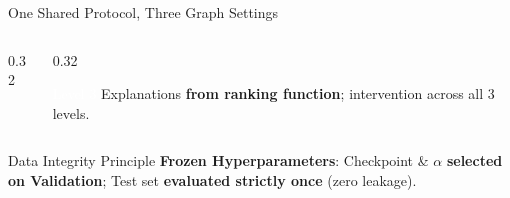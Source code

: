 \documentclass[aspectratio=169,10pt]{beamer}
\begin{document}
\begin{frame}{One Shared Protocol, Three Graph Settings}
\begin{columns}[t]
\begin{column}{0.32\textwidth}
    \end{column}
    \begin{column}{0.32\textwidth}
      \begin{block}{\textcolor{white}{Level 3}}\scriptsize
        Explanations \textbf{from ranking function}; intervention across all 3 levels.
      \end{block}
    \end{column}
  \end{columns}
  \vspace{0.08cm}
  \begin{exampleblock}{Data Integrity Principle}\scriptsize
    \textbf{Frozen Hyperparameters}: Checkpoint \& $\alpha$ \textbf{selected on Validation}; Test set \textbf{evaluated strictly once} (zero leakage).
  \end{exampleblock}
\end{frame}
\end{document}
